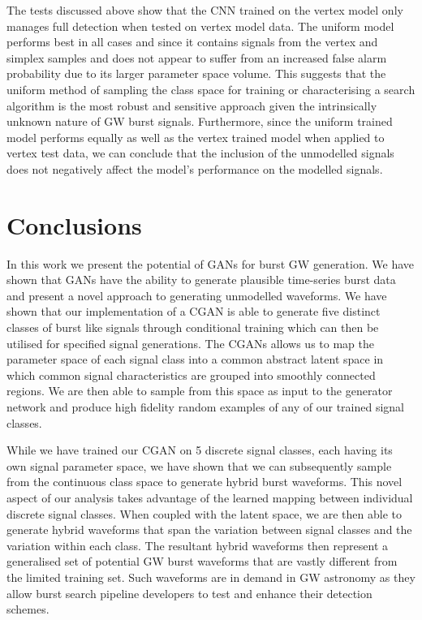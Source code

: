 \documentclass[12pt]{iopart}
\begin{document}
%
The tests discussed above show that the \ac{CNN} trained on the vertex model only manages full detection when tested on vertex model data. The uniform model performs best in all cases and since it contains signals from the vertex and simplex samples and does not appear to suffer from an increased false alarm probability due to its larger parameter space volume. This suggests that the uniform method of sampling the class space for training or characterising a search algorithm is the most robust and sensitive approach given the intrinsically unknown nature of GW burst signals. Furthermore, since the uniform trained model performs equally as well as the vertex trained model when applied to  vertex test data, we can conclude that the inclusion of the unmodelled signals does not negatively affect the model's performance on the modelled signals.

\section{Conclusions}\label{conclusions}

%
%
In this work we present the potential of \acp{GAN} for
burst GW generation. We have shown that \acp{GAN} have the ability to generate plausible time-series burst data and present a novel approach to generating unmodelled waveforms. We have shown that our implementation of a \ac{CGAN} is able to generate five distinct classes of burst like signals through conditional training which can then be utilised for specified signal generations. The \acp{CGAN} allows us to map the parameter space of each signal class into a common abstract latent space in which common signal characteristics are grouped into smoothly connected regions. We are then able to sample from this space as input to the generator network and produce high fidelity random examples of any of our trained signal classes.      

%
While we have trained our \ac{CGAN} on 5 discrete signal classes, each having its own signal parameter space, we have shown that we can subsequently sample from the continuous class space to generate hybrid burst waveforms. This novel aspect of our analysis takes advantage of the learned mapping between individual discrete signal classes. When coupled with the latent space, we are then able to generate hybrid waveforms that span the variation between signal classes and the variation within each class. The resultant hybrid waveforms then represent a generalised set of potential GW burst waveforms that are vastly different from the limited training set. Such waveforms are in demand in GW astronomy as they allow burst search pipeline developers to test and enhance their detection schemes.    
\end{document}
